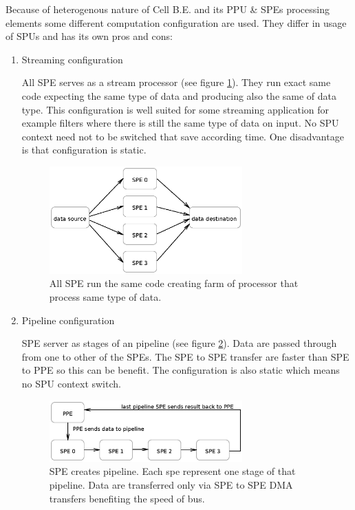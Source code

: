 \par
Because of heterogenous nature of Cell B.E. and its PPU \& SPEs processing elements some different computation configuration are used.
 They differ in usage of SPUs and has its own pros and cons:
\begin{enumerate}
\item Streaming configuration
\par
All SPE serves as a stream processor (see figure \ref{fg:streamingModel}).
They run exact same code expecting the same type of data and producing also the same of data type.
This configuration is well suited for some streaming application for example filters where there is still the same type of data on input.
No SPU context need not to be switched that save according time.
One disadvantage is that configuration is static.

\begin{figure}
    \centering
    \includegraphics[width=0.7\textwidth]{data/streamingModel}
    \caption[Streaming SPE configuration]{All SPE run the same code creating farm of processor that process same type of data.}
    \label{fg:streamingModel}
\end{figure}

\item Pipeline configuration
\par
SPE server as stages of an pipeline (see figure \ref{fg:pipelineModel}).
Data are passed through from one to other of the SPEs.
The SPE to SPE transfer are faster than SPE to PPE so this can be benefit.
The configuration is also static which means no SPU context switch.

\begin{figure}
    \centering
    \includegraphics[width=0.7\textwidth]{data/pipelineModel}
    \caption[Pipeline SPE configuration]{SPE creates pipeline. Each spe represent one stage of that pipeline. Data are transferred only via SPE to SPE DMA transfers benefiting the speed of bus.}
    \label{fg:pipelineModel}
\end{figure}


\end{enumerate}
